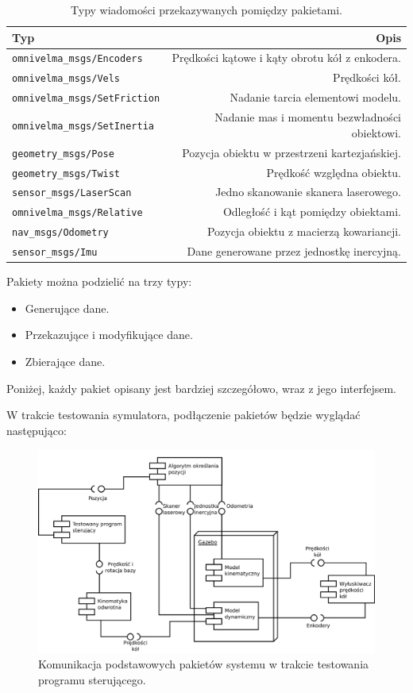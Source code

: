 \begin{table}
	\centering
	\begin{tabular}{l r}
		Typ & Opis \\
		\hline
		\texttt{omnivelma\_msgs/Encoders} & Prędkości kątowe i kąty obrotu kół z enkodera. \\
		\texttt{omnivelma\_msgs/Vels} & Prędkości kół. \\
		\texttt{omnivelma\_msgs/SetFriction} & Nadanie tarcia elementowi modelu. \\
		\texttt{omnivelma\_msgs/SetInertia} & Nadanie mas i momentu bezwładności obiektowi. \\
		\texttt{geometry\_msgs/Pose} & Pozycja obiektu w przestrzeni kartezjańskiej. \\
		\texttt{geometry\_msgs/Twist} & Prędkość względna obiektu. \\
		\texttt{sensor\_msgs/LaserScan} & Jedno skanowanie skanera laserowego. \\
		\texttt{omnivelma\_msgs/Relative} & Odległość i kąt pomiędzy obiektami. \\
		\texttt{nav\_msgs/Odometry} & Pozycja obiektu z macierzą kowariancji. \\
		\texttt{sensor\_msgs/Imu} & Dane generowane przez jednostkę inercyjną. \\
	\end{tabular}
	\caption{Typy wiadomości przekazywanych pomiędzy pakietami.}
	\label{tab:messages}
\end{table}

Pakiety można podzielić na trzy typy:
\begin{itemize}
	\item Generujące dane.
	\item Przekazujące i modyfikujące dane.
	\item Zbierające dane.
\end{itemize}
Poniżej, każdy pakiet opisany jest bardziej szczegółowo, wraz z jego interfejsem.

W trakcie testowania symulatora, podłączenie pakietów będzie wyglądać następująco:
\begin{figure}[H]
	\centering
	\includegraphics[width=\textwidth]{uml/final.pdf}
	\caption{Komunikacja podstawowych pakietów systemu w trakcie testowania programu sterującego.}
\end{figure}

